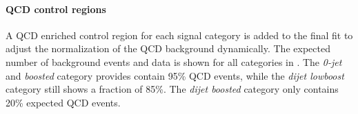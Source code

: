 \paragraph{QCD control regions}\mbox{} \newline
A QCD enriched control region for each signal category is added to the final fit to adjust the normalization of the QCD background dynamically. The
expected number of background events and data is shown for all categories in .
The \textit{0-jet} and \textit{boosted} category provides contain 95\% QCD events, while the \textit{dijet lowboost} category still shows a fraction of 85\%.
The \textit{dijet boosted} category only contains 20\% expected QCD events.

